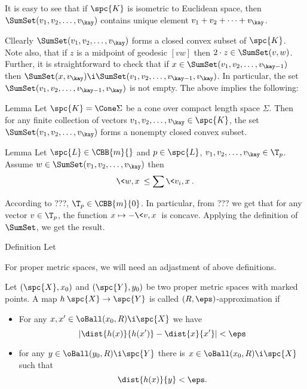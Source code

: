 It is easy to see that if $\spc{K}$ is isometric to Euclidean space,
then $\SumSet(v_1,v_2,\dots,v_\kay)$ contains unique element $v_1+v_2+\dots+v_\kay$.

Cllearly $\SumSet(v_1,v_2,\dots,v_\kay)$ forms a closed convex subset of $\spc{K}$.
Note also, that if $z$ is a midpoint of geodesic $[vw]$ then $2\cdot z\in \SumSet(v,w)$.
Further, it is straightforward to check that if $x\in\SumSet(v_1,v_2,\dots,v_{\kay-1})$ then $\SumSet(x,v_\kay)\i \SumSet(v_1,v_2,\dots,v_{\kay-1},v_\kay)$.
In particular, the set $\SumSet(v_1,v_2,\dots,v_{\kay-1},v_\kay)$ is not empty.
The above implies the following:

\begin{thm}{Lemma}
Let $\spc{K}=\Cone\Sigma$ be a cone over compact length space $\Sigma$.
Then for any finite collection of vectors $v_1,v_2,\dots,v_\kay\in\spc{K}$,
the set $\SumSet(v_1,v_2,\dots,v_\kay)$ forms a nonempty closed convex subset. 
\end{thm}

\begin{thm}{Lemma}\label{lem:plus}
Let $\spc{L}\in\CBB{m}{}$ and $p\in\spc{L}$, $v_1,v_2,\dots,v_\kay\in\T_p$.
Assume $w\in\SumSet(v_1,v_2,\dots,v_\kay)$ then 
$$\<w,x\>\le\sum\<v_i,x\>.$$
\end{thm}

According to ???, $\T_p\in\CBB{m}{0}$.
In particular, from ??? we get that for any vector $v\in \T_p$,
the function $x\mapsto -\<v,x\>$ is concave.
Applying the definition of $\SumSet$, we get the result.
\qeds

\begin{thm}{Definition}
Let 
\end{thm}














 For proper metric spaces, we will need an adjastment of above definitions.

Let $(\spc{X},x_0)$ and $(\spc{Y},y_0)$ be two proper metric spaces with marked points.
A map $h\:\spc{X}\to \spc{Y}$ is called $(R,\eps)$-approximation if 
\begin{itemize}
\item  For any $x,x'\in \oBall(x_0,R)\i \spc{X}$ we have
$$|\dist{h(x)}{h(x')}-\dist{x}{x'}|<\eps$$
\item for any $y\in \oBall(y_0,R)\i \spc{Y}$ there is $x\in \oBall(x_0,R)\i \spc{X}$ such that 
$$\dist{h(x)}{y}<\eps.$$
\end{itemize}

